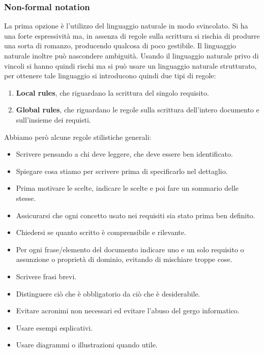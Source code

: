 \subsubsection{Non-formal notation}
La prima opzione è l'utilizzo del linguaggio naturale in modo svincolato. Si ha
una forte espressività ma, in assenza di regole sulla scrittura si rischia di
produrre una sorta di romanzo, producendo qualcosa di poco gestibile. Il linguaggio
naturale inoltre può nascondere ambiguità. Usando il linguaggio naturale privo
di vincoli si hanno quindi rischi ma si può usare un linguaggio naturale strutturato,
per ottenere tale linguaggio si introducono quindi due tipi di regole:
\begin{enumerate}
      \item \textbf{Local rules}, che riguardano la scrittura del singolo requisito.
      \item \textbf{Global rules}, che riguardano le regole sulla scrittura
            dell'intero documento e sull'insieme dei requisti.
\end{enumerate}
Abbiamo però alcune regole stilistiche generali:
\begin{itemize}
      \item Scrivere pensando a chi deve leggere, che deve essere ben identificato.
      \item Spiegare cosa stiamo per scrivere prima di specificarlo nel dettaglio.
      \item Prima motivare le scelte, indicare le scelte e poi fare un sommario delle stesse.
      \item Assicurarsi che ogni concetto usato nei requisiti sia stato prima ben definito.
      \item Chiedersi se quanto scritto è comprensibile e rilevante.
      \item Per ogni frase/elemento del documento indicare uno e un solo requisito
            o assunzione o proprietà di dominio, evitando di mischiare troppe cose.
      \item Scrivere frasi brevi.
      \item Distinguere ciò che è obbligatorio da ciò che è desiderabile.
      \item Evitare acronimi non necessari ed evitare l'abuso del gergo informatico.
      \item Usare esempi esplicativi.
      \item Usare diagrammi o illustrazioni quando utile.
\end{itemize}

